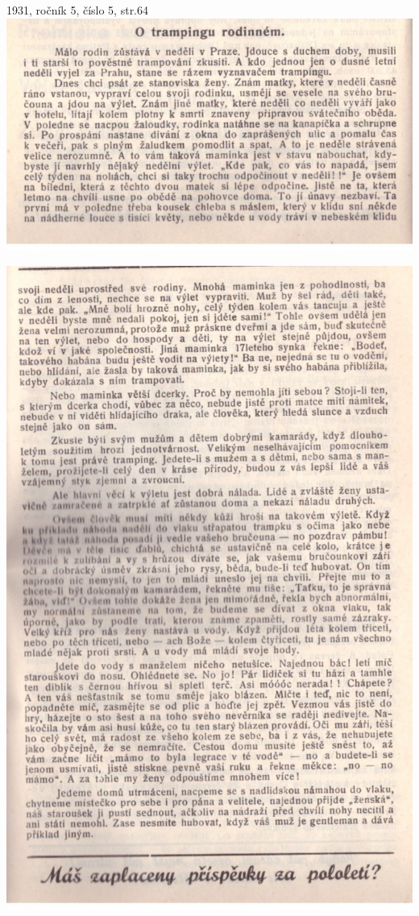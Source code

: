 \documentclass[11pt]{article}
\begin{document}
1931, ročník 5, číslo 5, str.64 \\
\includegraphics[width=\imagewidth]{original/1931/Skener_20250315 (6).jpg}

\includegraphics[width=\imagewidth]{original/1931/Skener_20250315 (7).jpg}
\end{document}
